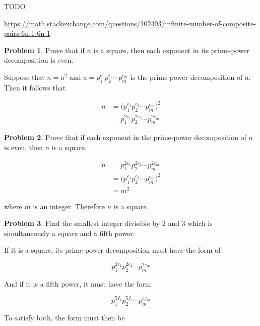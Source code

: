 \documentclass{article}
\theoremstyle{definition}
\newtheorem{problem}{Problem}[section]
\begin{document}
  TODO
  
  \url{https://math.stackexchange.com/questions/102493/infinite-number-of-composite-pairs-6n-1-6n-1}
  
  \begin{problem}
    Prove that if $n$ is a square, then each exponent in its prime-power decomposition is even.
  \end{problem}
  
  Suppose that $n = a^2$ and $a = p_1^{e_1}p_2^{e_2} \cdots p_m^{e_m}$ is the prime-power
  decomposition of $a$. Then it follows that
  
  \begin{align*}
    n &= \big(p_1^{e_1}p_2^{e_2} \cdots p_m^{e_m}\big)^2 \\
    &= p_1^{2e_1}p_2^{2e_2} \cdots p_m^{2e_m}
  \end{align*}
  
  \begin{problem}
    Prove that if each exponent in the prime-power decomposition of $n$ is even, then $n$ is a square.
  \end{problem}
  
  \begin{align*}
    n &= p_1^{2e_1}p_2^{2e_2} \cdots p_m^{2e_m} \\
    &= \big(p_1^{e_1}p_2^{e_2} \cdots p_m^{e_m}\big)^2 \\
    &= m^2
  \end{align*}
  
  where $m$ is an integer. Therefore $n$ is a square.
  
  \begin{problem}
    Find the smallest integer divisible by 2 and 3 which is simultaneously a square and a fifth power.
  \end{problem}
  
  If it is a square, its prime-power decomposition must have the form of
  
  \begin{equation*}
    p_1^{2e_1}p_2^{2e_2} \cdots p_m^{2e_m}
  \end{equation*}
  
  And if it is a fifth power, it must have the form
  
  \begin{equation*}
    p_1^{5f_1}p_2^{5f_2} \cdots p_m^{5f_m}
  \end{equation*}
  
  To satisfy both, the form must then be
  
\end{document}
